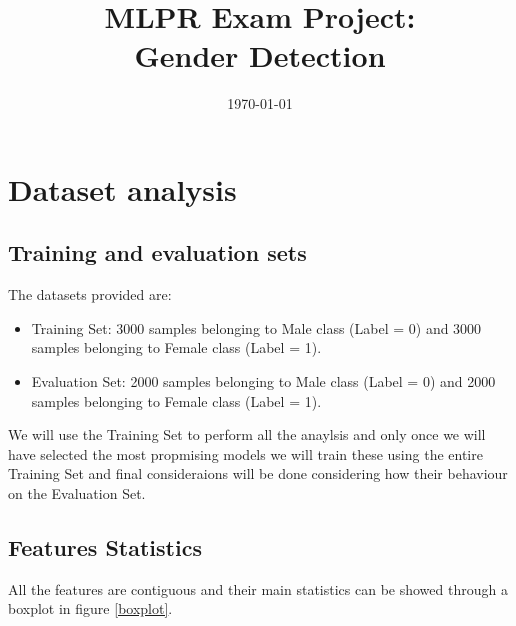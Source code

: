 \documentclass[10pt, a4paper, twocolumn]{article} %
\title{MLPR Exam Project: \\Gender Detection} %
\author{
	\authorstyle{Mattia Rosso [s294711]} %
}
\date{\today} %
\begin{document}
\maketitle %
\thispagestyle{firstpage} %




\section{Dataset analysis}
\subsection{Training and evaluation sets}
The datasets provided are:
\begin{itemize}
	\item Training Set: 3000 samples belonging to Male class (Label = 0) and
						3000 samples belonging to Female class (Label = 1).
	\item Evaluation Set: 2000 samples belonging to Male class (Label = 0) and
						  2000 samples belonging to Female class (Label = 1).
\end{itemize}
We will use the Training Set to perform all the anaylsis and only
once we will have selected the most propmising models we will train these using the 
entire Training Set and final consideraions will be done considering how their 
behaviour on the Evaluation Set.
\subsection{Features Statistics}
All the features are contiguous and their main statistics can be
showed through a boxplot in figure \ref{boxplot}. 
\end{document}
